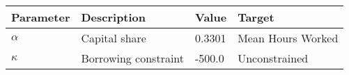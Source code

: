 \begin{tabular}{l l l l} 
\hline 
Parameter & Description & Value & Target \\ 
\hline 
$\alpha$ & Capital share & 0.3301 & Mean Hours Worked \\ 
$\kappa$ & Borrowing constraint & -500.0 & Unconstrained \\ 
\hline 
\end{tabular}